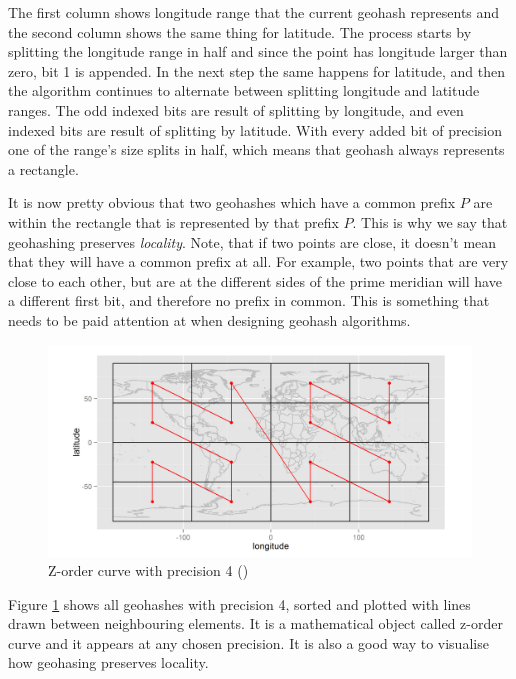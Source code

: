 \documentclass[times, utf8, diplomski]{fer}
\begin{document}
The first column shows longitude range that the current geohash represents and the second column shows the same thing for latitude. The process starts by splitting the longitude range in half and since the point has longitude larger than zero, bit 1 is appended. In the next step the same happens for latitude, and then the algorithm continues to alternate between splitting longitude and latitude ranges. The odd indexed bits are result of splitting by longitude, and even indexed bits are result of splitting by latitude. With every added bit of precision one of the range's size splits in half, which means that geohash always represents a rectangle.

It is now pretty obvious that two geohashes which have a common prefix $P$ are within the rectangle that is represented by that prefix $P$. This is why we say that geohashing preserves \emph{locality}. Note, that if two points are close, it doesn't mean that they will have a common prefix at all. For example, two points that are very close to each other, but are at the different sides of the prime meridian will have a different first bit, and therefore no prefix in common. This is something that needs to be paid attention at when designing geohash algorithms.

\begin{figure}[h]
\includegraphics[width=\textwidth]{z_curve}
\caption{Z-order curve with precision 4 (\cite {spatiotemporal})}
\label{fig:zcurve}
\end{figure}

Figure \ref{fig:zcurve} shows all geohashes with precision 4, sorted and plotted with lines drawn between neighbouring elements. It is a mathematical object called z-order curve \cite{zcurve} and it appears at any chosen precision. It is also a good way to visualise how geohasing preserves locality.
\end{document}
